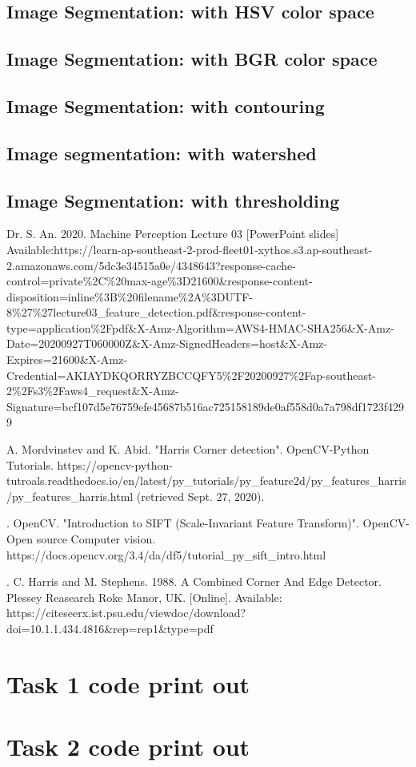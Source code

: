 \documentclass[conference]{IEEEtran}
\begin{document}
\subsection{Image Segmentation: with HSV color space}

\subsection{Image Segmentation: with BGR color space}

\subsection{Image Segmentation: with contouring}

\subsection{Image segmentation: with watershed}

\subsection{Image Segmentation: with thresholding}

\newpage
\clearpage
\begin{thebibliography}{00}
 Dr. S. An. 2020. Machine Perception Lecture 03 [PowerPoint slides] Available:https://learn-ap-southeast-2-prod-fleet01-xythos.s3.ap-southeast-2.amazonaws.com/5dc3e34515a0e/4348643?response-cache-control=private\%2C\%20max-age\%3D21600\&response-content-disposition=inline\%3B\%20filename\%2A\%3DUTF-8\%27\%27lecture03\_feature\_detection.pdf\&response-content-type=application\%2Fpdf\&X-Amz-Algorithm=AWS4-HMAC-SHA256\&X-Amz-Date=20200927T060000Z\&X-Amz-SignedHeaders=host\&X-Amz-Expires=21600\&X-Amz-Credential=AKIAYDKQORRYZBCCQFY5\%2F20200927\%2Fap-southeast-2\%2Fs3\%2Faws4\_request\&X-Amz-Signature=bcf107d5e76759efe45687b516ac725158189de0af558d0a7a798df1723f4299

 A. Mordvinstev and K. Abid. "Harris Corner detection". OpenCV-Python Tutorials. https://opencv-python-tutroals.readthedocs.io/en/latest/py\_tutorials/py\_feature2d/py\_features\_harris/py\_features\_harris.html (retrieved Sept. 27, 2020).

. OpenCV. "Introduction to SIFT (Scale-Invariant Feature Transform)". OpenCV-Open source Computer vision. https://docs.opencv.org/3.4/da/df5/tutorial\_py\_sift\_intro.html

. C. Harris and M. Stephens. 1988. A Combined Corner And Edge Detector. Plessey Reasearch Roke Manor, UK. [Online]. Available: https://citeseerx.ist.psu.edu/viewdoc/download?doi=10.1.1.434.4816\&rep=rep1\&type=pdf

\end{thebibliography}

\appendix

\begin{appendices}
	\section{Task 1 code print out}\label{ap 1}

	\section{Task 2 code print out}
\end{appendices}
\end{document}
